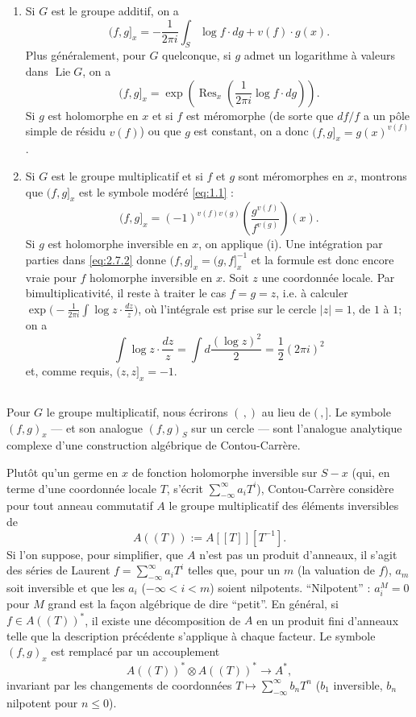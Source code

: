 \documentclass[12pt,a4paper]{article}
\theoremstyle{plain}
\theoremstyle{definition}
\theoremstyle{remark}
\DeclareMathOperator{\Res}{Res}
\begin{document}
\begin{enumerate}[label=(\roman*)]
\item Si $G$ est le groupe additif, on a
\[
(f,g]_x = -\frac{1}{2\pi i} \int_S \log f \cdot dg + v(f) \cdot g(x).
\]
Plus généralement, pour $G$ quelconque, si $g$ admet un logarithme à valeurs dans $\operatorname{Lie} G$,
on a
\[
(f,g]_x = \exp\left(\Res_x\left(\frac{1}{2\pi i} \log f \cdot dg\right)\right).
\]
Si $g$ est holomorphe en $x$ et si $f$ est méromorphe (de sorte que $df/f$ a un pôle simple
de résidu $v(f)$) ou que $g$ est constant, on a donc $(f,g]_x = g(x)^{v(f)}$.

\item Si $G$ est le groupe multiplicatif et si $f$ et $g$ sont méromorphes en $x$, montrons
que $(f,g]_x$ est le symbole modéré \eqref{eq:1.1} :
\[
(f,g]_x = (-1)^{v(f)v(g)} \left(\frac{g^{v(f)}}{f^{v(g)}}\right)(x).
\]
Si $g$ est holomorphe inversible en $x$, on applique (i). Une intégration par parties
dans \eqref{eq:2.7.2} donne $(f,g]_x = (g,f]_x^{-1}$ et la formule est donc encore vraie pour $f$
holomorphe inversible en $x$. Soit $z$ une coordonnée locale. Par bimultiplicativité, il reste à
traiter le cas $f = g = z$, i.e. à calculer $\exp\bigl(-\frac{1}{2\pi i} \int \log z \cdot \frac{dz}{z}\bigr)$, où l'intégrale est prise
sur le cercle $|z| = 1$, de $1$ à $1$; on a
\[
\int \log z \cdot \frac{dz}{z} = \int d\frac{(\log z)^2}{2} = \frac{1}{2}(2\pi i)^2
\]
et, comme requis, $(z,z]_x = -1$.
\end{enumerate}

\subsection{}

Pour $G$ le groupe multiplicatif, nous écrirons $(\,,)$ au lieu de $(\,,]$. Le symbole $(f,g)_x$ --- et son analogue $(f,g)_S$ sur un cercle --- sont l'analogue analytique complexe
d'une construction algébrique de Contou-Carrère.

Plutôt qu'un germe en $x$ de fonction holomorphe inversible sur $S - x$ (qui, en
terme d'une coordonnée locale $T$, s'écrit $\sum_{-\infty}^{\infty} a_i T^i$), Contou-Carrère considère pour tout
anneau commutatif $A$ le groupe multiplicatif des éléments inversibles de
\[
A((T)) := A[[T]][T^{-1}].
\]
Si l'on suppose, pour simplifier, que $A$ n'est pas un produit d'anneaux, il s'agit des séries
de Laurent $f = \sum_{-\infty}^{\infty} a_i T^i$ telles que, pour un $m$ (la valuation de $f$), $a_m$ soit inversible et
que les $a_i$ ($-\infty < i < m$) soient nilpotents. ``Nilpotent'' : $a_i^M = 0$ pour $M$ grand est
la façon algébrique de dire ``petit''. En général, si $f \in A((T))^*$, il existe une décomposition de $A$ en un produit fini d'anneaux telle que la description précédente s'applique
à chaque facteur. Le symbole $(f,g)_x$ est remplacé par un accouplement
\begin{equation}\label{eq:2.9.1}
A((T))^* \otimes A((T))^* \to A^*,
\end{equation}
invariant par les changements de coordonnées $T \mapsto \sum_{-\infty}^{\infty} b_n T^n$ ($b_1$ inversible, $b_n$ nilpotent
pour $n \leq 0$).
\end{document}
